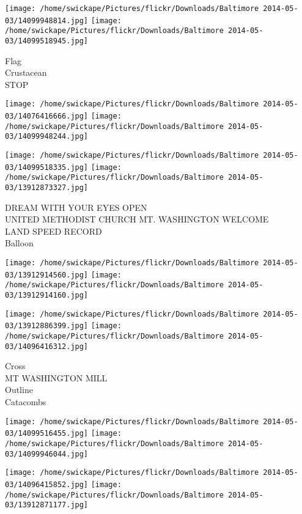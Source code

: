 \documentclass[10pt,letterpaper]{article}
\begin{document}
\vspace{0.25in}
\texttt{[image: /home/swickape/Pictures/flickr/Downloads/Baltimore 2014-05-03/14099948814.jpg]}
\texttt{[image: /home/swickape/Pictures/flickr/Downloads/Baltimore 2014-05-03/14099518945.jpg]}

Flag\\
Crustacean\\
STOP\\
\pagebreak

\texttt{[image: /home/swickape/Pictures/flickr/Downloads/Baltimore 2014-05-03/14076416666.jpg]}
\texttt{[image: /home/swickape/Pictures/flickr/Downloads/Baltimore 2014-05-03/14099948244.jpg]}

\texttt{[image: /home/swickape/Pictures/flickr/Downloads/Baltimore 2014-05-03/14099518335.jpg]}
\texttt{[image: /home/swickape/Pictures/flickr/Downloads/Baltimore 2014-05-03/13912873327.jpg]}

DREAM WITH YOUR EYES OPEN\\
UNITED METHODIST CHURCH MT. WASHINGTON WELCOME\\
LAND SPEED RECORD\\
Balloon\\
\pagebreak

\texttt{[image: /home/swickape/Pictures/flickr/Downloads/Baltimore 2014-05-03/13912914560.jpg]}
\texttt{[image: /home/swickape/Pictures/flickr/Downloads/Baltimore 2014-05-03/13912914160.jpg]}

\texttt{[image: /home/swickape/Pictures/flickr/Downloads/Baltimore 2014-05-03/13912886399.jpg]}
\texttt{[image: /home/swickape/Pictures/flickr/Downloads/Baltimore 2014-05-03/14096416312.jpg]}

Cross\\
MT WASHINGTON MILL\\
Outline\\
Catacombs\\
\pagebreak

\texttt{[image: /home/swickape/Pictures/flickr/Downloads/Baltimore 2014-05-03/14099516455.jpg]}
\texttt{[image: /home/swickape/Pictures/flickr/Downloads/Baltimore 2014-05-03/14099946044.jpg]}

\texttt{[image: /home/swickape/Pictures/flickr/Downloads/Baltimore 2014-05-03/14096415852.jpg]}
\texttt{[image: /home/swickape/Pictures/flickr/Downloads/Baltimore 2014-05-03/13912871177.jpg]}
\end{document}
